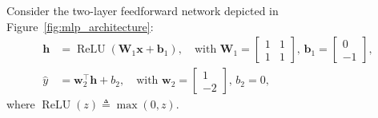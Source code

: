 Consider the two-layer feedforward network depicted in Figure~\ref{fig:mlp_architecture}:
\begin{align}
\mathbf{h} &= \operatorname{ReLU}(\mathbf{W}_1 \mathbf{x} + \mathbf{b}_1), \quad \text{with } \mathbf{W}_1 = \begin{bmatrix} 1 & 1 \\ 1 & 1 \end{bmatrix}, \, \mathbf{b}_1 = \begin{bmatrix} 0 \\ -1 \end{bmatrix}, \label{eq:xor_hidden_forward} \\
\hat{y} &= \mathbf{w}_2^\top \mathbf{h} + b_2, \quad \text{with } \mathbf{w}_2 = \begin{bmatrix} 1 \\ -2 \end{bmatrix}, \, b_2 = 0, \label{eq:xor_output_forward}
\end{align}
where $\operatorname{ReLU}(z) \triangleq \max(0, z)$.

